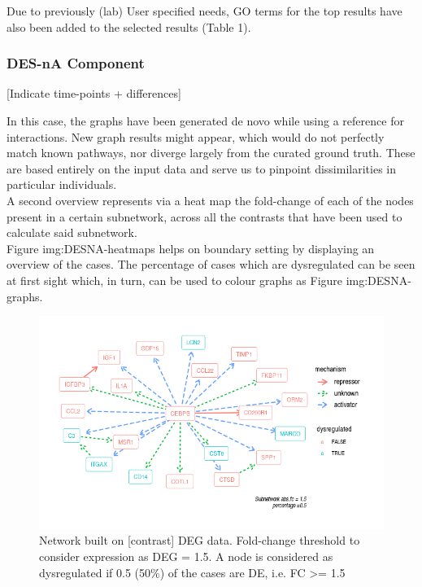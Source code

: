 Due to previously (lab) User specified needs, GO terms for the top results have also been added to the selected results (Table 1).

\subsubsection{DES-nA Component}
[Indicate time-points + differences]

In this case, the graphs have been generated de novo while using a reference for interactions. New graph results might appear, which would do not perfectly match known pathways, nor diverge largely from the curated ground truth. These are based entirely on the input data and serve us to pinpoint dissimilarities in particular individuals.
\\

A second overview represents via a heat map the fold-change of each of the nodes present in a certain subnetwork, across all the contrasts that have been used to calculate said subnetwork. 
\\

Figure img:DESNA-heatmaps helps on boundary setting by displaying an overview of the cases. The percentage of cases which are dysregulated can be seen at first sight which, in turn, can be used to colour graphs as Figure img:DESNA-graphs. 
\\

\begin{figure}
    \centering
    \includegraphics[width=\textwidth]{Major Thesis/figures/desna/desna-network.png}
    \caption{Network built on [contrast] DEG data. Fold-change threshold to consider expression as DEG = 1.5. A node is considered as dysregulated if 0.5 (50\%) of the cases are DE, i.e. FC >= 1.5}
    \label{fig:desna-network}
\end{figure}

